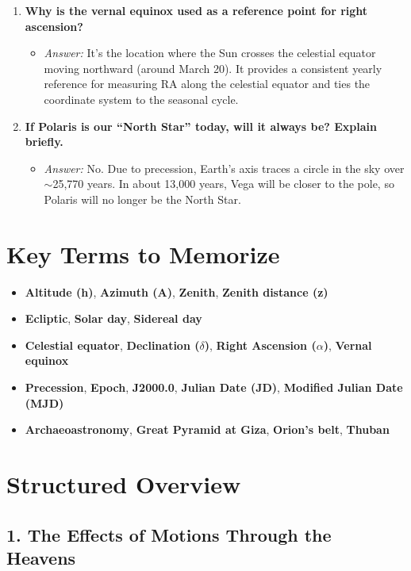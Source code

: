 \begin{enumerate}
  \item \textbf{Why is the vernal equinox used as a reference point for right ascension?}
  \begin{itemize}
    \item \emph{Answer:} It’s the location where the Sun crosses the celestial equator moving northward (around March 20). It provides a consistent yearly reference for measuring RA along the celestial equator and ties the coordinate system to the seasonal cycle.
  \end{itemize}
  
  \item \textbf{If Polaris is our ``North Star'' today, will it always be? Explain briefly.}
  \begin{itemize}
    \item \emph{Answer:} No. Due to precession, Earth’s axis traces a circle in the sky over $\sim$25{,}770 years. In about 13,000 years, Vega will be closer to the pole, so Polaris will no longer be the North Star.
  \end{itemize}
\end{enumerate}

\section{Key Terms to Memorize}
\begin{itemize}
  \item \textbf{Altitude (h)}, \textbf{Azimuth (A)}, \textbf{Zenith}, \textbf{Zenith distance (z)}
  \item \textbf{Ecliptic}, \textbf{Solar day}, \textbf{Sidereal day}
  \item \textbf{Celestial equator}, \textbf{Declination ($\delta$)}, \textbf{Right Ascension ($\alpha$)}, \textbf{Vernal equinox}
  \item \textbf{Precession}, \textbf{Epoch}, \textbf{J2000.0}, \textbf{Julian Date (JD)}, \textbf{Modified Julian Date (MJD)}
  \item \textbf{Archaeoastronomy}, \textbf{Great Pyramid at Giza}, \textbf{Orion’s belt}, \textbf{Thuban}
\end{itemize}
\section{Structured Overview}

\subsection{1. The Effects of Motions Through the Heavens}

